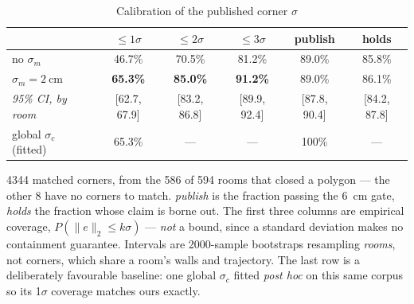 \documentclass[conference,letterpaper,10pt]{IEEEtran}
\begin{document}
\begin{table}[t]
\centering
\caption{Calibration of the published corner $\sigma$}
\label{tab:calib}
\setlength{\tabcolsep}{2pt}
\footnotesize
\begin{tabular}{lccccc}
\toprule
& $\le 1\sigma$ & $\le 2\sigma$ & $\le 3\sigma$ & publish & holds \\
\midrule
no $\sigma_m$                & 46.7\% & 70.5\% & 81.2\% & 89.0\% & 85.8\% \\
$\sigma_m=\SI{2}{\centi\meter}$ & \textbf{65.3\%} & \textbf{85.0\%} & \textbf{91.2\%} & 89.0\% & 86.1\% \\
\emph{95\% CI, by room} & \scriptsize{[62.7, 67.9]} & \scriptsize{[83.2, 86.8]}
                             & \scriptsize{[89.9, 92.4]} & \scriptsize{[87.8, 90.4]}
                             & \scriptsize{[84.2, 87.8]} \\
\midrule
global $\sigma_c$ (fitted) & 65.3\% & --- & --- & 100\% & --- \\
\bottomrule
\end{tabular}

\vspace{2pt}
\begin{minipage}{\columnwidth}
\footnotesize
\num{4344} matched corners, from the \num{586} of \num{594} rooms that closed a polygon --- the other
\num{8} have no corners to match. \emph{publish} is the fraction passing the \SI{6}{\centi\meter}
gate, \emph{holds} the fraction whose claim is borne out. The first three columns are empirical
coverage, $P(\lVert e \rVert_2 \le k\sigma)$ --- \emph{not} a bound, since a standard deviation makes
no containment guarantee. Intervals are \num{2000}-sample bootstraps resampling \emph{rooms}, not
corners, which share a room's walls and trajectory. The last row is a deliberately favourable
baseline: one global $\sigma_c$ fitted \emph{post hoc} on this same corpus so its \num{1}$\sigma$
coverage matches ours exactly.
\end{minipage}
\end{table}
\end{document}

